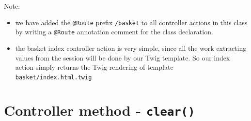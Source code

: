 \documentclass[a4paperpaper,openright]{book}
\newenvironment{Shaded}{}{}
\newcommand{\AnnotationTok}[1]{\textcolor[rgb]{0.38,0.63,0.69}{\textbf{\textit{#1}}}}
\newcommand{\CommentTok}[1]{\textcolor[rgb]{0.38,0.63,0.69}{\textit{#1}}}
\newcommand{\KeywordTok}[1]{\textcolor[rgb]{0.00,0.44,0.13}{\textbf{#1}}}
\newcommand{\NormalTok}[1]{#1}
\newcommand{\OtherTok}[1]{\textcolor[rgb]{0.00,0.44,0.13}{#1}}
\newcommand{\StringTok}[1]{\textcolor[rgb]{0.25,0.44,0.63}{#1}}
\begin{document}
\begin{Shaded}
\end{Shaded}

Note:

\begin{itemize}
\item
  we have added the \texttt{@Route} prefix \texttt{/basket} to all
  controller actions in this class by writing a \texttt{@Route}
  annotation comment for the class declaration.
\item
  the basket index controller action is very simple, since all the work
  extracting values from the session will be done by our Twig template.
  So our index action simply returns the Twig rendering of template
  \texttt{basket/index.html.twig}
\end{itemize}

\hypertarget{controller-method---clear}{%
\section{\texorpdfstring{Controller method -
\texttt{clear()}}{Controller method - clear()}}\label{controller-method---clear}}
\end{document}
